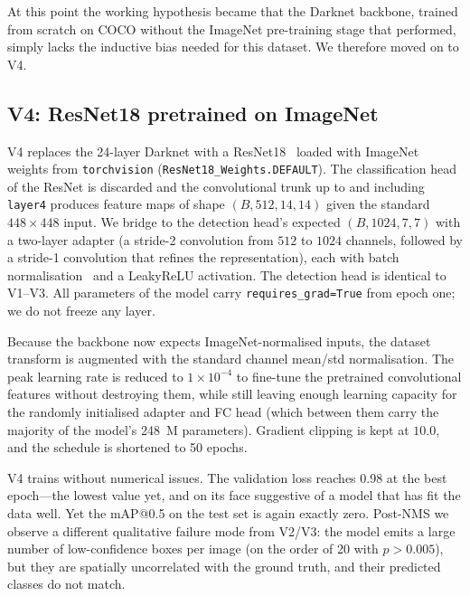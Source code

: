 At this point the working hypothesis became that the Darknet backbone, trained
from scratch on COCO without the ImageNet pre-training stage that
\citet{redmon2016you} performed, simply lacks the inductive bias needed for
this dataset. We therefore moved on to V4.

\subsection{V4: ResNet18 pretrained on ImageNet}
\label{sec:experiments:v4}

V4 replaces the 24-layer Darknet with a ResNet18~\citep{he2016deep} loaded with
ImageNet weights from \texttt{torchvision} (\texttt{ResNet18\_Weights.DEFAULT}).
The classification head of the ResNet is discarded and the convolutional trunk
up to and including \texttt{layer4} produces feature maps of shape
$(B, 512, 14, 14)$ given the standard $448\times 448$ input. We bridge to the
detection head's expected $(B, 1024, 7, 7)$ with a two-layer adapter (a
stride-2 convolution from $512$ to $1024$ channels, followed by a stride-1
convolution that refines the representation), each with batch
normalisation~\citep{ioffe2015batch} and a LeakyReLU activation. The detection
head is identical to V1--V3. All parameters of the model carry
\texttt{requires\_grad=True} from epoch one; we do not freeze any layer.

Because the backbone now expects ImageNet-normalised inputs, the dataset
transform is augmented with the standard channel mean/std normalisation. The
peak learning rate is reduced to $1\!\times\!10^{-4}$ to fine-tune the
pretrained convolutional features without destroying them, while still leaving
enough learning capacity for the randomly initialised adapter and FC head
(which between them carry the majority of the model's 248~M parameters).
Gradient clipping is kept at $10.0$, and the schedule is shortened to 50
epochs.

V4 trains without numerical issues. The validation loss reaches 0.98 at the
best epoch---the lowest value yet, and on its face suggestive of a model that
has fit the data well. Yet the mAP@0.5 on the test set is again exactly zero.
Post-NMS we observe a different qualitative failure mode from V2/V3: the
model emits a large number of low-confidence boxes per image (on the order
of 20 with $p > 0.005$), but they are spatially uncorrelated with the ground
truth, and their predicted classes do not match.

